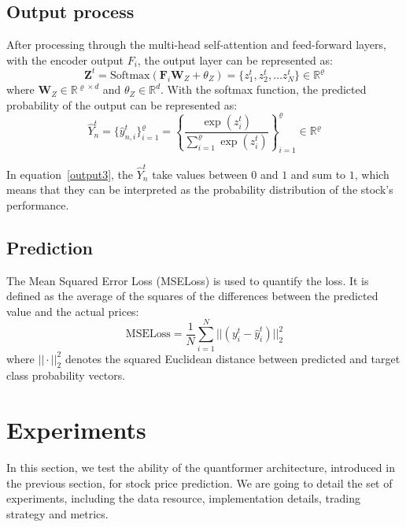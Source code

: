 \documentclass[preprint,12pt]{elsarticle}
\begin{document}
\subsection{Output process}
After processing through the multi-head self-attention and feed-forward layers, with the encoder output $F_i$, the output layer can be represented as:
\begin{equation} 
\mathbf{Z}^t = \mathrm{Softmax}(\mathbf{F}_i \mathbf{W}_Z + \theta_Z)
= \lbrace z^{t}_1, z^{t}_2, \ldots z^{t}_N \rbrace 
\in \mathbb{R}^{\varrho} 
\label{output1} 
\end{equation}
where $\mathbf{W}_Z \in \mathbb{R}^{\varrho \times d}$ and $\theta_Z \in \mathbb{R}^d$. With the softmax function, the predicted probability of the output can be represented as:
    \begin{equation}
        \hat{Y}^{t}_{n} = \{ \hat{y}^t_{n,i} \}^{\varrho}_{i=1} =  \left\{ \frac{\exp(z^t_i)}{\sum^{\varrho}_{i=1} \exp(z^t_i)} \right\}^{\varrho}_{i=1} \in \mathbb{R}^{\varrho}
        \label{output3}
    \end{equation}

In equation~\eqref{output3}, the $\hat{Y}^{t}_{n}$ take values between $0$ and $1$ and sum to $1$, which means that they can be interpreted as the probability distribution of the stock's performance. 

\subsection{Prediction}
The Mean Squared Error Loss (MSELoss) is used to quantify the loss. It is defined as the average of the squares of the differences between the predicted value and the actual prices:
    \begin{equation}
        \mathrm{MSELoss} = \frac{1}{N}  \sum^{N}_{i=1} || (y^t_i - \hat{y}^t_i)||^2_2
        \label{MSE}
    \end{equation}
where $||\cdot||^2_2$ denotes the squared Euclidean distance between predicted and target class probability vectors.

\section{Experiments} \label{experiments}

In this section, we test the ability of the quantformer architecture, introduced in the previous section, for stock price prediction. We are going to detail the set of experiments, including the data resource, implementation details, trading strategy and metrics. 
\end{document}
